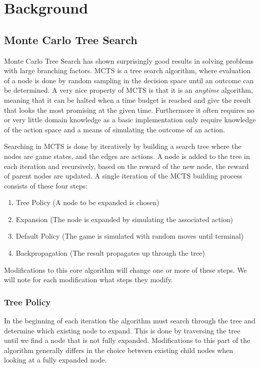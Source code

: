 \documentclass[10pt,a4paper]{article}
\begin{document}
\section{Background}
\subsection{Monte Carlo Tree Search}

Monte Carlo Tree Search has shown surprisingly good results in solving problems with large branching factors. MCTS is a tree search algorithm, where evaluation of a node is done by random sampling in the decision space until an outcome can be determined. A very nice property of MCTS is that it is an \emph{anytime} algorithm, meaning that it can be halted when a time budget is reached and give the result that looks the most promising at the given time. Furthermore it often requires no or very little domain knowledge as a basic implementation only require knowledge of the action space and a means of simulating the outcome of an action.


Searching in MCTS is done by iteratively by building a search tree where the nodes are game states, and the edges are actions. A node is added to the tree in each iteration and recursively, based on the reward of the new node, the reward of parent nodes are updated.
A single iteration of the MCTS building process consists of these four steps:
\begin{enumerate}
\item Tree Policy (A node to be expanded is chosen)
\item Expansion (The node is expanded by simulating the associated action)
\item Default Policy (The game is simulated with random moves until terminal)
\item Backpropagation (The result propagates up through the tree)
\end{enumerate}
Modifications to this core algorithm will change one or more of these steps. We will note for each modification what steps they modify.
\subsubsection{Tree Policy}
In the beginning of each iteration the algorithm must search through the tree and determine which existing node to expand. This is done by traversing the tree until we find a node that is not fully expanded. Modifications to this part of the algorithm generally differs in the choice between existing child nodes when looking at a fully expanded node.
\end{document}
